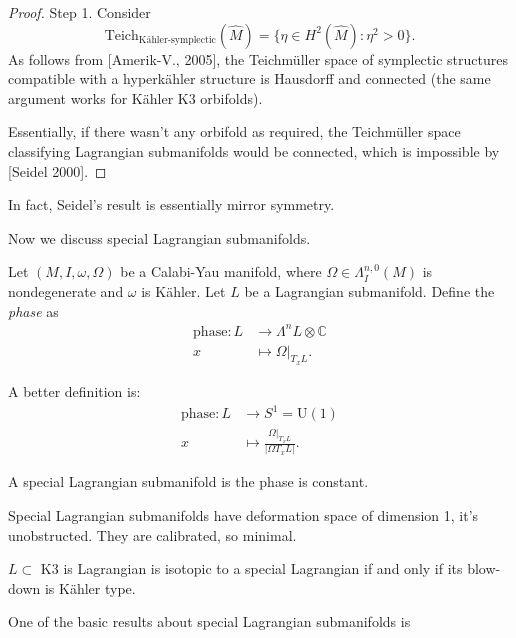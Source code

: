 \begin{proof}
\noindent
Step 1. Consider
$$
\text{Teich}_{\text{Kähler-symplectic}}
(\hat{M})
=\{\eta \in H^{2}(\hat{M}):\eta^2>0\}.
$$
As follows from [Amerik-V., 2005], the
Teichmüller space of symplectic structures
compatible
with a hyperkähler structure is Hausdorff and
connected
(the same argument works for Kähler K3
orbifolds).

Essentially, if there wasn't any orbifold
as required, the Teichmüller space
classifying
Lagrangian submanifolds would be connected,
which
is impossible by [Seidel 2000].
\end{proof}

\noindent
In fact, Seidel's result is essentially
mirror symmetry.

\medskip\noindent
Now we discuss special Lagrangian
submanifolds.

\begin{definition}
\label{definition-phase}
Let $(M,I,\omega,\Omega)$ be a Calabi-Yau
manifold, where
$\Omega \in \Lambda^{n,0}_I(M)$ is
nondegenerate and $\omega$ is Kähler.
Let $L$ be a Lagrangian submanifold.
Define the {\it phase} as
$$
\begin{aligned}
\text{phase}: L &\longrightarrow \Lambda^nL
\otimes \mathbb{C} \\
x &\longmapsto \Omega|_{T_xL}.
\end{aligned}
$$
\end{definition}

\noindent
A better definition is:
$$
\begin{aligned}
\text{phase}: L &\longrightarrow
S^1=\text{U}(1) \\
x &\longmapsto \frac{\Omega|_{T_xL}}{|\Omega
T_xL|}.
\end{aligned}
$$

\begin{definition}
\label{definition-special-lagrangian}
A special Lagrangian submanifold is the phase
is constant.
\end{definition}

\noindent
Special Lagrangian submanifolds have
deformation space of
dimension 1, it's unobstructed. They are
calibrated, so minimal.

\begin{theorem}
\label{theorem-lagrangians-of-k3}
$L \subset$ K3 is Lagrangian is isotopic to a
special Lagrangian
if and only if its blow-down is Kähler type.
\end{theorem}

\medskip\noindent
One of the basic results about special
Lagrangian
submanifolds is

